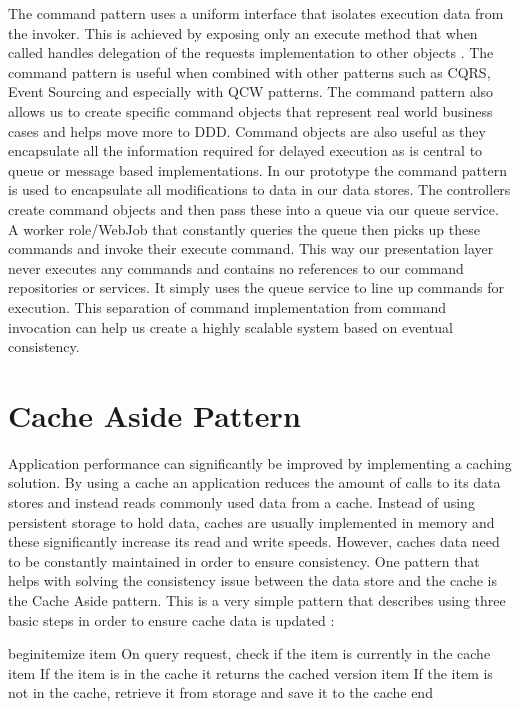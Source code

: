  The command pattern uses a uniform interface that isolates execution data from the invoker. This is achieved by exposing only an execute method that when called handles delegation of the requests implementation to other objects \cite{Gamma1994-ho}. The command pattern is useful when combined with other patterns such as CQRS, Event Sourcing and especially with QCW patterns. The command pattern also allows us to create specific command objects that represent real world business cases and helps move more to DDD. Command objects are also useful as they encapsulate all the information required for delayed execution \cite{Gamma1994-ho} as is central to queue or message based implementations. In our prototype the command pattern is used to encapsulate all modifications to data in our data stores. The controllers create command objects and then pass these into a queue via our queue service. A worker role/WebJob that constantly queries the queue then picks up these commands and invoke their execute command. This way our presentation layer never executes any commands and contains no references to our command repositories or services. It simply uses the queue service to line up commands for execution. This separation of command implementation from command invocation can help us create a highly scalable system based on eventual consistency.
 
 
 \section{Cache Aside Pattern}
 
 Application performance can significantly be improved by implementing a caching solution. By using a cache an application reduces the amount of calls to its data stores and instead reads commonly used data from a cache. Instead of using persistent storage to hold data, caches are usually implemented in memory and these significantly increase its read and write speeds. However, caches data need to be constantly maintained in order to ensure consistency. One pattern that helps with solving the consistency issue between the data store and the cache is the Cache Aside pattern. This is a very simple pattern that describes using three basic steps in order to ensure cache data is updated \cite{Swanson}:
 
    begin{itemize}
        item On query request, check if the item is currently in the cache
        item If the item is in the cache it returns the cached version
        item If the item is not in the cache, retrieve it from storage and         save it to the cache
    end
 

